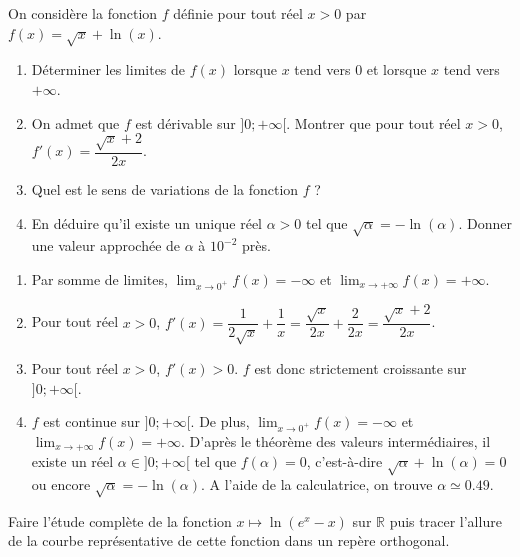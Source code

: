 \documentclass[11pt,fleqn, openany]{book} %
\begin{document}
\begin{exercise}[topic=log03]On considère la fonction $f$ définie pour tout réel $x>0$ par $f(x)=\sqrt{x}+\ln(x)$. 
\begin{enumerate}
\item Déterminer les limites de $f(x)$ lorsque $x$ tend vers 0 et lorsque $x$ tend vers $+\infty$.
\item On admet que $f$ est dérivable sur $]0;+\infty[$. Montrer que pour tout réel $x>0$, $f'(x)=\dfrac{\sqrt{x}+2}{2x}$.
\item Quel est le sens de variations de la fonction $f$ ?
\item En déduire qu'il existe un unique réel $\alpha>0$ tel que $\sqrt{\alpha}=-\ln(\alpha)$. Donner une valeur approchée de $\alpha$ à $10^{-2}$ près.\end{enumerate}\end{exercise}

\begin{solution}\hspace{0pt}

\begin{enumerate}
\item Par somme de limites, $\displaystyle\lim_{x\to 0^+}f(x)=-\infty$ et $\displaystyle\lim_{x\to+\infty}f(x)=+\infty$.
\item Pour tout réel $x>0$, $f'(x)=\dfrac{1}{2\sqrt{x}}+\dfrac{1}{x}=\dfrac{\sqrt{x}}{2x}+\dfrac{2}{2x}=\dfrac{\sqrt{x}+2}{2x}$.
\item Pour tout réel $x>0$, $f'(x)>0$. $f$ est donc strictement croissante sur $]0;+\infty[$.
\item $f$ est continue sur $]0;+\infty[$. De plus, $\displaystyle\lim_{x\to 0^+}f(x)=-\infty$ et $\displaystyle\lim_{x\to+\infty}f(x)=+\infty$. D'après le théorème des valeurs intermédiaires, il existe un réel $\alpha \in ]0;+\infty[$ tel que $f(\alpha)=0$, c'est-à-dire $\sqrt{\alpha}+\ln(\alpha)=0$ ou encore $\sqrt{\alpha}=-\ln(\alpha)$. A l'aide de la calculatrice, on trouve $\alpha \simeq 0.49$.
\end{enumerate}

\end{solution}




\begin{exercise}[topic=log03]Faire l'étude complète de la fonction $x\mapsto \ln(e^x-x)$ sur $\mathbb{R}$ puis tracer l'allure de la courbe représentative de cette fonction dans un repère orthogonal.\newpage \end{exercise}
\end{document}
